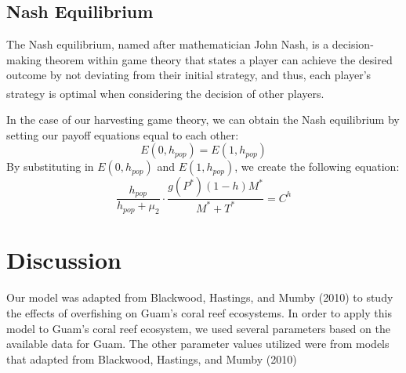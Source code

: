 \documentclass[12pt]{article}
\begin{document}
\subsection{Nash Equilibrium}
The Nash equilibrium, named after mathematician John Nash, is a decision-making theorem within game theory that states a player can achieve the desired outcome by not deviating from their initial strategy, and thus, each player's strategy is optimal when considering the decision of other players\textsuperscript{\cite{nash_definition}}. \par
In the case of our harvesting game theory, we can obtain the Nash equilibrium by setting our payoff equations equal to each other:
\begin{equation*}
    E(0, h_{pop}) = E(1, h_{pop})
\end{equation*}
By substituting in $E(0, h_{pop})$ and $E(1, h_{pop})$, we create the following equation:
\begin{equation*}\label{eq:unsimplified_nash}
    \frac{h_{pop}}{h_{pop} + \mu_{2}} \cdot \frac{g(P^{*})(1-h)M^{*}}{M^{*} + T^{*}} = C^{h}
\end{equation*}

\section{Discussion}
Our model was adapted from Blackwood, Hastings, and Mumby (2010) to study the effects of overfishing on Guam's coral reef ecosystems. In order to apply this model to Guam's coral reef ecosystem, we used several parameters based on the available data for Guam. The other parameter values utilized were from models that adapted from Blackwood, Hastings, and Mumby (2010)



\end{document}
